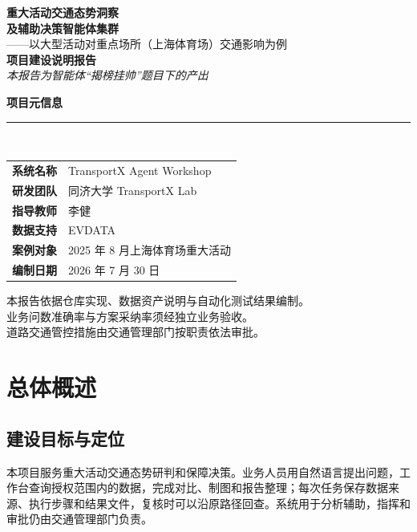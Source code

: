\documentclass[a4paper,11pt]{article}
\newcommand{\metarow}[2]{\textbf{#1} & #2 \\}
\begin{document}
\begin{titlepage}
\centering
\vspace*{2.5cm}

{\sffamily\bfseries\Huge 重大活动交通态势洞察\\[0.4em]及辅助决策智能体集群}\\[1.5em]

{\large\sffamily——以大型活动对重点场所（上海体育场）交通影响为例}\\[1.5em]

{\Large\bfseries\sffamily 项目建设说明报告}\\[1em]
{\small\sffamily\itshape 本报告为智能体“揭榜挂帅”题目下的产出}\\[2em]

{\small\sffamily
\textbf{\large 项目元信息}\\[4pt]
\rule{0.5\linewidth}{0.5pt}\\[8pt]
\begin{tabularx}{0.85\linewidth}{@{}lX@{}}
\metarow{系统名称}{TransportX Agent Workshop}
\metarow{研发团队}{同济大学 TransportX Lab}
\metarow{指导教师}{李健}
\metarow{数据支持}{EVDATA}
\metarow{案例对象}{2025 年 8 月上海体育场重大活动}
\metarow{编制日期}{2026 年 7 月 30 日}
\end{tabularx}
}

\vfill

{\footnotesize\sffamily 本报告依据仓库实现、数据资产说明与自动化测试结果编制。\\业务问数准确率与方案采纳率须经独立业务验收。\\道路交通管控措施由交通管理部门按职责依法审批。}

\vspace{1.5cm}
\end{titlepage}

\section{总体概述}

\subsection{建设目标与定位}

本项目服务重大活动交通态势研判和保障决策。业务人员用自然语言提出问题，工作台查询授权范围内的数据，完成对比、制图和报告整理；每次任务保存数据来源、执行步骤和结果文件，复核时可以沿原路径回查。系统用于分析辅助，指挥和审批仍由交通管理部门负责。
\end{document}
